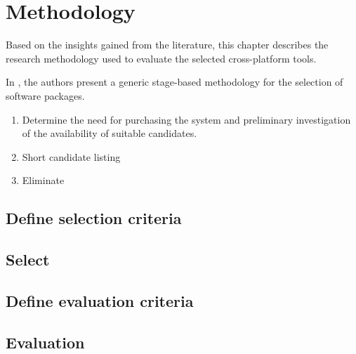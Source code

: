 \chapter{Methodology}
\label{chap:methodology}

Based on the insights gained from the literature, this chapter describes the research methodology used to evaluate the selected cross-platform tools. 

In \cite{jadhav:09}, the authors present a generic stage-based methodology for the selection of software packages. 

\begin{enumerate}
    \item Determine the need for purchasing the system and preliminary investigation of the availability of suitable candidates.
    \item Short candidate listing
    \item Eliminate 
\end{enumerate}


\section{Define selection criteria}

\section{Select }

\section{Define evaluation criteria}

\section{Evaluation}

\section{}


